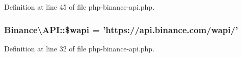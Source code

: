Definition at line 45 of file php-\/binance-\/api.\-php.

\hypertarget{classBinance_1_1API_a52a5376574ff759fb1df6c8efe24cb7f}{
\subsubsection[{\$wapi}]{\setlength{\rightskip}{0pt plus 5cm}Binance\textbackslash{}\-A\-P\-I\-::\$wapi = 'https\-://api.\-binance.\-com/wapi/'\hspace{0.3cm}{\ttfamily [protected]}}}\label{classBinance_1_1API_a52a5376574ff759fb1df6c8efe24cb7f}


Definition at line 32 of file php-\/binance-\/api.\-php.

